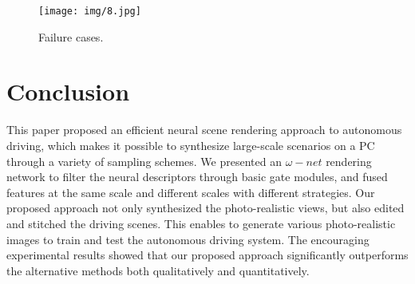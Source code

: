 \documentclass[sigconf]{acmart}
\begin{document}
\begin{figure}[h]
  \centering
  \texttt{[image: img/8.jpg]}
  \caption{Failure cases.}
\label{fig:label8}
\end{figure}
 
\section{Conclusion}
This paper proposed an efficient neural scene rendering approach to autonomous driving, which makes it possible to synthesize large-scale scenarios on a PC through a variety of sampling schemes. We presented an $\omega-net$ rendering network to filter the neural descriptors through basic gate modules, and fused features at the same scale and different scales with different strategies. Our proposed approach not only synthesized the photo-realistic views, but also edited and stitched the driving scenes. This enables to generate various photo-realistic images to train and test the autonomous driving system. The encouraging experimental results showed that our proposed approach significantly outperforms the alternative methods both qualitatively and quantitatively.





\newpage




\appendix
\end{document}
